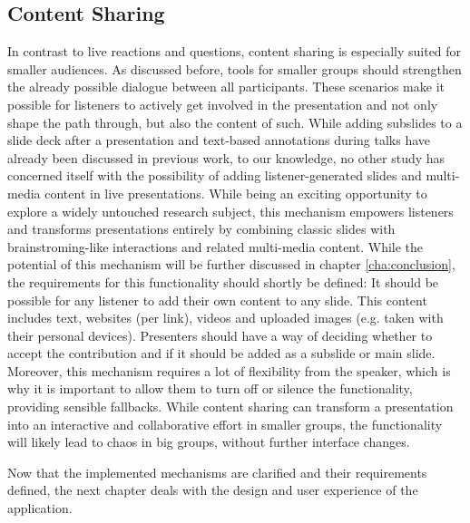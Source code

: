 \subsection{Content Sharing}
In contrast to live reactions and questions, content sharing is especially suited for smaller audiences. As discussed before, tools for smaller groups should strengthen the already possible dialogue between all participants. These scenarios make it possible for listeners to actively get involved in the presentation and not only shape the path through, but also the content of such. While adding subslides to a slide deck after a presentation \cite{Cheng:TreebasedOnlinePresentations} and text-based annotations \cite{Inoue:RealTimeQuestionnaire, Myers:CollaborationPDAs} during talks have already been discussed in previous work, to our knowledge, no other study has concerned itself with the possibility of adding listener-generated slides and multi-media content in live presentations. While being an exciting opportunity to explore a widely untouched research subject, this mechanism empowers listeners and transforms presentations entirely by combining classic slides with brainstroming-like interactions and related multi-media content. While the potential of this mechanism will be further discussed in chapter \ref{cha:conclusion}, the requirements for this functionality should shortly be defined: It should be possible for any listener to add their own content to any slide. This content includes text, websites (per link), videos and uploaded images (e.g. taken with their personal devices). Presenters should have a way of deciding whether to accept the contribution and if it should be added as a subslide or main slide. Moreover, this mechanism requires a lot of flexibility from the speaker, which is why it is important to allow them to turn off or silence the functionality, providing sensible fallbacks. While content sharing can transform a presentation into an interactive and collaborative effort in smaller groups, the functionality will likely lead to chaos in big groups, without further interface changes.

Now that the implemented mechanisms are clarified and their requirements defined, the next chapter deals with the design and user experience of the application.


